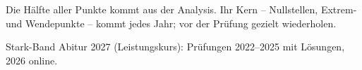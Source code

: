 \documentclass[12pt]{extarticle}
\newcommand{\abschnitt}[1]{\par\vspace{18pt}{\large\bfseries #1}\par\vspace{5pt}}
\begin{document}
\par\vspace{8pt}
{\small Die Hälfte aller Punkte kommt aus der Analysis. Ihr Kern -- Nullstellen, Extrem- und Wendepunkte -- kommt jedes Jahr; vor der Prüfung gezielt wiederholen.}
\abschnitt{Alte Prüfungen zum Üben}
Stark-Band Abitur 2027 (Leistungskurs): Prüfungen 2022--2025 mit Lösungen, 2026 online.
\end{document}
